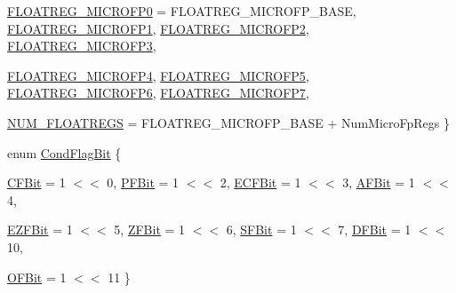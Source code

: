 \begin{DoxyCompactItemize}
\hyperlink{namespaceX86ISA_a50e93c80b4d3e47dea8b60bf4b9a4f77a32489c5950be8689bef5197d008f7f94}{FLOATREG\_\-MICROFP0} =  FLOATREG\_\-MICROFP\_\-BASE, 
\hyperlink{namespaceX86ISA_a50e93c80b4d3e47dea8b60bf4b9a4f77a4832642ed06a99fd4a846fc079efa45f}{FLOATREG\_\-MICROFP1}, 
\hyperlink{namespaceX86ISA_a50e93c80b4d3e47dea8b60bf4b9a4f77aef4062807c5a8f84f76459cc4520f1b4}{FLOATREG\_\-MICROFP2}, 
\hyperlink{namespaceX86ISA_a50e93c80b4d3e47dea8b60bf4b9a4f77afcea97ae71eca1b0fa8d9903b0b4ba7c}{FLOATREG\_\-MICROFP3}, 
\par
\hyperlink{namespaceX86ISA_a50e93c80b4d3e47dea8b60bf4b9a4f77a875c37e4154d2325d8da8cb15c4941cf}{FLOATREG\_\-MICROFP4}, 
\hyperlink{namespaceX86ISA_a50e93c80b4d3e47dea8b60bf4b9a4f77aec3fbec2ccab52bc5bc83a7db56bbbec}{FLOATREG\_\-MICROFP5}, 
\hyperlink{namespaceX86ISA_a50e93c80b4d3e47dea8b60bf4b9a4f77a4d6e2301ce4263233a00da7d60c20354}{FLOATREG\_\-MICROFP6}, 
\hyperlink{namespaceX86ISA_a50e93c80b4d3e47dea8b60bf4b9a4f77ae87c5ba95d1c988cf0ac19dbf2b52b22}{FLOATREG\_\-MICROFP7}, 
\par
\hyperlink{namespaceX86ISA_a50e93c80b4d3e47dea8b60bf4b9a4f77ac6d76e7696c1b491a95b087f3d9e9011}{NUM\_\-FLOATREGS} =  FLOATREG\_\-MICROFP\_\-BASE + NumMicroFpRegs
 \}
\item 
enum \hyperlink{namespaceX86ISA_a77b692cff87fc41556e3b66c6bd280ef}{CondFlagBit} \{ \par
\hyperlink{namespaceX86ISA_a77b692cff87fc41556e3b66c6bd280efa62ac5fecddec7e35f26fe6c1dd9b314d}{CFBit} =  1 $<$$<$ 0, 
\hyperlink{namespaceX86ISA_a77b692cff87fc41556e3b66c6bd280efa798bced7abb6bf2610b74f95e343f704}{PFBit} =  1 $<$$<$ 2, 
\hyperlink{namespaceX86ISA_a77b692cff87fc41556e3b66c6bd280efa7b80af3e8a80d7602d61c112b3586cb6}{ECFBit} =  1 $<$$<$ 3, 
\hyperlink{namespaceX86ISA_a77b692cff87fc41556e3b66c6bd280efa1bb29e738d486a33fd9176959eb32f7a}{AFBit} =  1 $<$$<$ 4, 
\par
\hyperlink{namespaceX86ISA_a77b692cff87fc41556e3b66c6bd280efa76692c30605c03a1c15022ac59c5786f}{EZFBit} =  1 $<$$<$ 5, 
\hyperlink{namespaceX86ISA_a77b692cff87fc41556e3b66c6bd280efa7e10a81d022d2c831c3b5f18e6a07083}{ZFBit} =  1 $<$$<$ 6, 
\hyperlink{namespaceX86ISA_a77b692cff87fc41556e3b66c6bd280efac86653d6637c179c8efd1e61b35d446b}{SFBit} =  1 $<$$<$ 7, 
\hyperlink{namespaceX86ISA_a77b692cff87fc41556e3b66c6bd280efa61ef7c21faf294255f08fc10a4c8cdb1}{DFBit} =  1 $<$$<$ 10, 
\par
\hyperlink{namespaceX86ISA_a77b692cff87fc41556e3b66c6bd280efa9e94f6bac88df7cacaba4b3aaa20aca0}{OFBit} =  1 $<$$<$ 11
 \}
\item 
$$
\end{DoxyCompactItemize}
